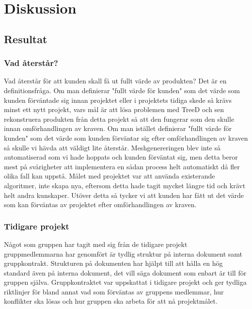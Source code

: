 \chapter{Diskussion}
\label{cha:discussion}

\section{Resultat}
\label{sec:discussion-results}

\subsection{Vad återstår?}
Vad återstår för att kunden skall få ut fullt värde av produkten? Det är en definitionsfråga. Om man definierar "fullt värde för kunden" som det värde som kunden förväntade sig innan projektet eller i projektets tidiga skede så krävs minst ett nytt projekt, vars mål är att lösa problemen med TreeD och sen rekonstruera produkten från detta projekt så att den fungerar som den skulle innan omförhandlingen av kraven. Om man istället definierar "fullt värde för kunden" som det värde som kunden förväntar sig efter omförhandlingen av kraven så skulle vi hävda att väldigt lite återstår. Meshgenereringen blev inte så automatiserad som vi hade hoppats och kunden förväntat sig, men detta beror mest på svårigheter att implementera en sådan process helt automatiskt då fler olika fall kan uppstå. Målet med projektet var att använda existerande algoritmer, inte skapa nya, eftersom detta hade tagit mycket längre tid och krävt helt andra kunskaper. Utöver detta så tycker vi att kunden har fått ut det värde som kan förväntas av projektet efter omförhandlingen av kraven. 

\subsection{Tidigare projekt}
Något som gruppen har tagit med sig från de tidigare projekt gruppmedlemmarna har genomfört är tydlig struktur på interna dokument samt gruppkontrakt. Strukturen på dokumenten har hjälpt till att hålla en hög standard även på interna dokument, det vill säga dokument som enbart är till för gruppen själva. Gruppkontraktet var uppskattat i tidigare projekt och ger tydliga riktlinjer för bland annat vad som förväntas av gruppens medlemmar, hur konflikter ska lösas och hur gruppen ska arbeta för att nå projektmålet.

